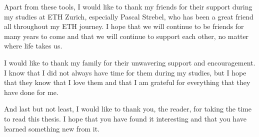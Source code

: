 Apart from these tools, I would like to thank my friends for their support during my studies at ETH Zurich, 
especially Pascal Strebel, who has been a great friend all throughout my ETH journey.
I hope that we will continue to be friends for many years to come and that we will continue to support each other, no matter where life takes us.

I would like to thank my family for their unwavering support and encouragement.
I know that I did not always have time for them during my studies, 
but I hope that they know that I love them and that I am grateful for everything that they have done for me.

And last but not least, I would like to thank you, the reader, for taking the time to read this thesis.
I hope that you have found it interesting and that you have learned something new from it.
